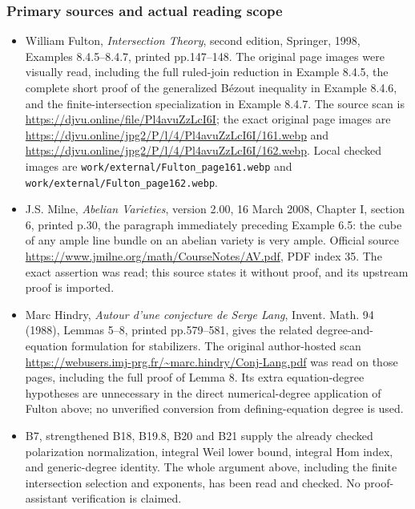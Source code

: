 \documentclass[11pt,a4paper]{article}
\providecommand{\tightlist}{\setlength{\itemsep}{0pt}\setlength{\parskip}{0pt}}
\theoremstyle{definition}
\begin{document}
\subsubsection{Primary sources and actual reading scope}\label{primary-sources-and-actual-reading-scope}

\begin{itemize}
\tightlist
\item
  William Fulton, \emph{Intersection Theory}, second edition, Springer, 1998, Examples 8.4.5--8.4.7, printed pp.147--148. The original page images were visually read, including the full ruled-join reduction in Example 8.4.5, the complete short proof of the generalized Bézout inequality in Example 8.4.6, and the finite-intersection specialization in Example 8.4.7. The source scan is \url{https://djvu.online/file/Pl4avuZzLcI6I}; the exact original page images are \url{https://djvu.online/jpg2/P/l/4/Pl4avuZzLcI6I/161.webp} and \url{https://djvu.online/jpg2/P/l/4/Pl4avuZzLcI6I/162.webp}. Local checked images are \texttt{work/external/Fulton\_page161.webp} and \texttt{work/external/Fulton\_page162.webp}.
\item
  J.S. Milne, \emph{Abelian Varieties}, version 2.00, 16 March 2008, Chapter I, section 6, printed p.30, the paragraph immediately preceding Example 6.5: the cube of any ample line bundle on an abelian variety is very ample. Official source \url{https://www.jmilne.org/math/CourseNotes/AV.pdf}, PDF index 35. The exact assertion was read; this source states it without proof, and its upstream proof is imported.
\item
  Marc Hindry, \emph{Autour d'une conjecture de Serge Lang}, Invent. Math. 94 (1988), Lemmas 5--8, printed pp.579--581, gives the related degree-and-equation formulation for stabilizers. The original author-hosted scan \url{https://webusers.imj-prg.fr/~marc.hindry/Conj-Lang.pdf} was read on those pages, including the full proof of Lemma 8. Its extra equation-degree hypotheses are unnecessary in the direct numerical-degree application of Fulton above; no unverified conversion from defining-equation degree is used.
\item
  B7, strengthened B18, B19.8, B20 and B21 supply the already checked polarization normalization, integral Weil lower bound, integral Hom index, and generic-degree identity. The whole argument above, including the finite intersection selection and exponents, has been read and checked. No proof-assistant verification is claimed.
\end{itemize}
\end{document}
